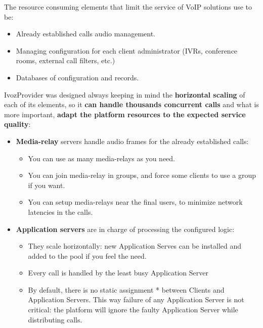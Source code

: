 \documentclass[letterpaper,10pt,english]{sphinxmanual}
\begin{document}
The resource consuming elements that limit the service of VoIP solutions
use to be:
\begin{itemize}
\item {} 
Already established calls audio management.

\item {} 
Managing configuration for each client administrator (IVRs, conference
rooms, external call filters, etc.)

\item {} 
Databases of configuration and records.

\end{itemize}

IvozProvider was designed always keeping in mind the \textbf{horizontal
scaling} of each of its elements, so it \textbf{can handle thousands concurrent calls}
and what is more important, \textbf{adapt the platform resources to the expected service quality}:
\begin{itemize}
\item {} 
\textbf{Media-relay} servers handle audio frames for the already established
calls:
\begin{itemize}
\item {} 
You can use as many media-relays as you need.

\item {} 
You can join media-relay in groups, and force some clients to use a
group if you want.

\item {} 
You can setup media-relays near the final users, to minimize network
latencies in the calls.

\end{itemize}

\item {} 
\textbf{Application servers} are in charge of processing the configured logic:
\begin{itemize}
\item {} 
They scale horizontally: new Application Serves can be installed and
added to the pool if you feel the need.

\item {} 
Every call is handled by the least busy Application Server

\item {} 
By default, there is no static assignment * between Clients and
Application Servers. This way failure of any Application Server is not
critical: the platform will ignore the faulty Application Server while
distributing calls.

\end{itemize}

\end{itemize}
\end{document}

